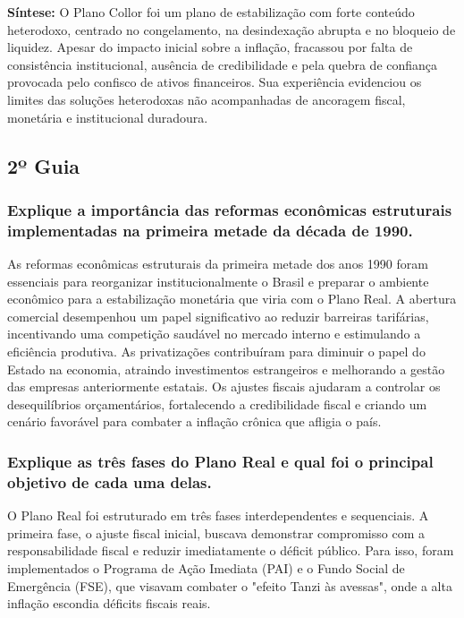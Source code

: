 \documentclass[a4paper,12pt]{article}[abntex2]
\begin{document}
\textbf{Síntese:} O Plano Collor foi um plano de estabilização com forte conteúdo heterodoxo, centrado no congelamento, na desindexação abrupta e no bloqueio de liquidez. Apesar do impacto inicial sobre a inflação, fracassou por falta de consistência institucional, ausência de credibilidade e pela quebra de confiança provocada pelo confisco de ativos financeiros. Sua experiência evidenciou os limites das soluções heterodoxas não acompanhadas de ancoragem fiscal, monetária e institucional duradoura.

\subsection{\textbf{2º Guia}}
\subsubsection{\textbf{Explique a importância das reformas econômicas estruturais implementadas na primeira metade da década de 1990.}}

As reformas econômicas estruturais da primeira metade dos anos 1990 foram essenciais para reorganizar institucionalmente o Brasil e preparar o ambiente econômico para a estabilização monetária que viria com o Plano Real. A abertura comercial desempenhou um papel significativo ao reduzir barreiras tarifárias, incentivando uma competição saudável no mercado interno e estimulando a eficiência produtiva. As privatizações contribuíram para diminuir o papel do Estado na economia, atraindo investimentos estrangeiros e melhorando a gestão das empresas anteriormente estatais. Os ajustes fiscais ajudaram a controlar os desequilíbrios orçamentários, fortalecendo a credibilidade fiscal e criando um cenário favorável para combater a inflação crônica que afligia o país.

\subsubsection{\textbf{Explique as três fases do Plano Real e qual foi o principal objetivo de cada uma delas.}}

O Plano Real foi estruturado em três fases interdependentes e sequenciais. A primeira fase, o ajuste fiscal inicial, buscava demonstrar compromisso com a responsabilidade fiscal e reduzir imediatamente o déficit público. Para isso, foram implementados o Programa de Ação Imediata (PAI) e o Fundo Social de Emergência (FSE), que visavam combater o "efeito Tanzi às avessas", onde a alta inflação escondia déficits fiscais reais.
\end{document}
